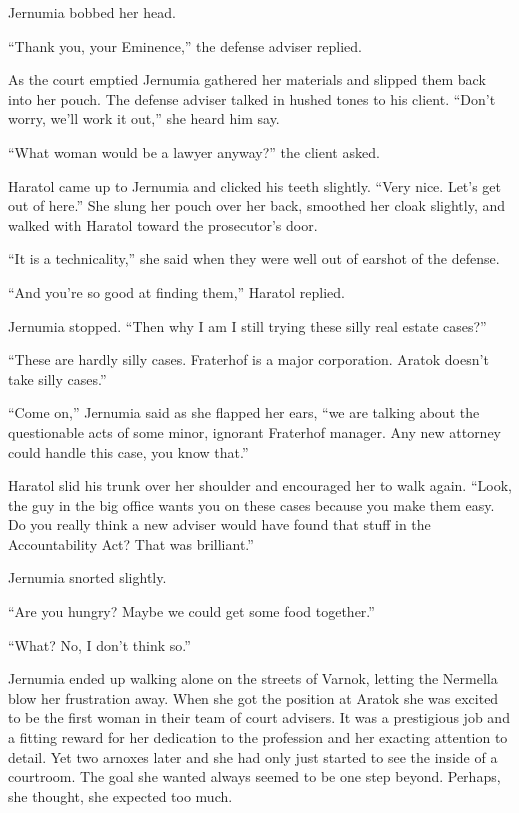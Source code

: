 Jernumia bobbed her head.

``Thank you, your Eminence,'' the defense adviser replied.

As the court emptied Jernumia gathered her materials and slipped them back into her pouch. The
defense adviser talked in hushed tones to his client. ``Don't worry, we'll work it out,'' she
heard him say.

``What woman would be a lawyer anyway?'' the client asked.

Haratol came up to Jernumia and clicked his teeth slightly. ``Very nice. Let's get out of
here.'' She slung her pouch over her back, smoothed her cloak slightly, and walked with Haratol
toward the prosecutor's door.

``It is a technicality,'' she said when they were well out of earshot of the defense.

``And you're so good at finding them,'' Haratol replied.

Jernumia stopped. ``Then why I am I still trying these silly real estate cases?''

``These are hardly silly cases. Fraterhof is a major corporation. Aratok doesn't take silly
cases.''

``Come on,'' Jernumia said as she flapped her ears, ``we are talking about the questionable acts
of some minor, ignorant Fraterhof manager. Any new attorney could handle this case, you know
that.''

Haratol slid his trunk over her shoulder and encouraged her to walk again. ``Look, the guy in
the big office wants you on these cases because you make them easy. Do you really think a new
adviser would have found that stuff in the Accountability Act? That was brilliant.''

Jernumia snorted slightly.

``Are you hungry? Maybe we could get some food together.''

``What? No, I don't think so.''

Jernumia ended up walking alone on the streets of Varnok, letting the Nermella blow her
frustration away. When she got the position at Aratok she was excited to be the first woman in
their team of court advisers. It was a prestigious job and a fitting reward for her dedication
to the profession and her exacting attention to detail. Yet two arnoxes later and she had only
just started to see the inside of a courtroom. The goal she wanted always seemed to be one step
beyond. Perhaps, she thought, she expected too much.

